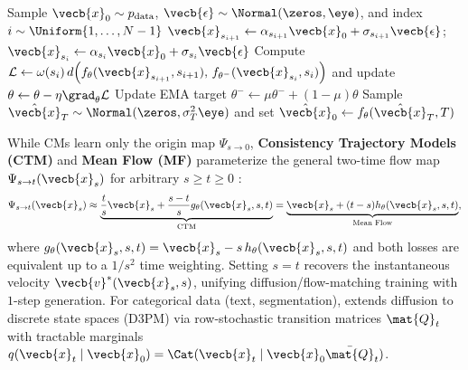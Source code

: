 \documentclass[../../../../master.tex]{subfiles}
\begin{document}
\begin{algorithm}[htbp]
  \caption{Consistency Training (CT) \& Multi-Step Consistency Sampling }
  \label{alg:dsolver:cm_train_sample}
  Sample $\vecb{x}_0 \sim p_{\mathrm{data}}$, $\vecb{\epsilon} \sim \Normal(\zeros, \eye)$, and index $i \sim \Uniform\{1, \dots, N-1\}$\;
  $\vecb{x}_{s_{i+1}} \gets \alpha_{s_{i+1}}\vecb{x}_0 + \sigma_{s_{i+1}}\vecb{\epsilon}$; \quad $\vecb{x}_{s_i} \gets \alpha_{s_i}\vecb{x}_0 + \sigma_{s_i}\vecb{\epsilon}$\;
  Compute $\mathcal{L} \gets \omega(s_i)\, d\!\left(f_\theta(\vecb{x}_{s_{i+1}}, s_{i+1}),\, f_{\theta^-}(\vecb{x}_{s_i}, s_i)\right)$ and update $\theta \gets \theta - \eta\grad_\theta\mathcal{L}$\;
  Update EMA target $\theta^- \gets \mu\theta^- + (1-\mu)\theta$\;
  Sample $\hat{\vecb{x}}_T \sim \Normal(\zeros, \sigma_T^2\eye)$ and set $\hat{\vecb{x}}_0 \gets f_\theta(\hat{\vecb{x}}_T, T)$\;
\end{algorithm}

\begin{crossbook}
While CMs learn only the origin map $\Psi_{s\to 0}$, \textbf{Consistency Trajectory Models (CTM)} and \textbf{Mean Flow (MF)} parameterize the general two-time flow map $\Psi_{s\to t}(\vecb{x}_s)$ for arbitrary $s \ge t \ge 0$ :
\begin{equation}
  \label{eq:dsolver:ctm_mf}
  \Psi_{s\to t}(\vecb{x}_s)
  \approx \underbrace{\frac{t}{s}\vecb{x}_s + \frac{s-t}{s} g_\theta(\vecb{x}_s, s, t)}_{\text{CTM}}
  = \underbrace{\vecb{x}_s + (t-s) h_\theta(\vecb{x}_s, s, t)}_{\text{Mean Flow}},
\end{equation}
where $g_\theta(\vecb{x}_s, s, t) = \vecb{x}_s - s\, h_\theta(\vecb{x}_s, s, t)$ and both losses are equivalent up to a $1/s^2$ time weighting. Setting $s=t$ recovers the instantaneous velocity $\vecb{v}^*(\vecb{x}_s, s)$, unifying diffusion/flow-matching training with $1$-step generation. For categorical data (text, segmentation),  extends diffusion to discrete state spaces (D3PM) via row-stochastic transition matrices $\mat{Q}_t$ with tractable marginals $q(\vecb{x}_t\mid\vecb{x}_0) = \Cat(\vecb{x}_t \mid \vecb{x}_0 \bar{\mat{Q}}_t)$.
\end{crossbook}
\end{document}
